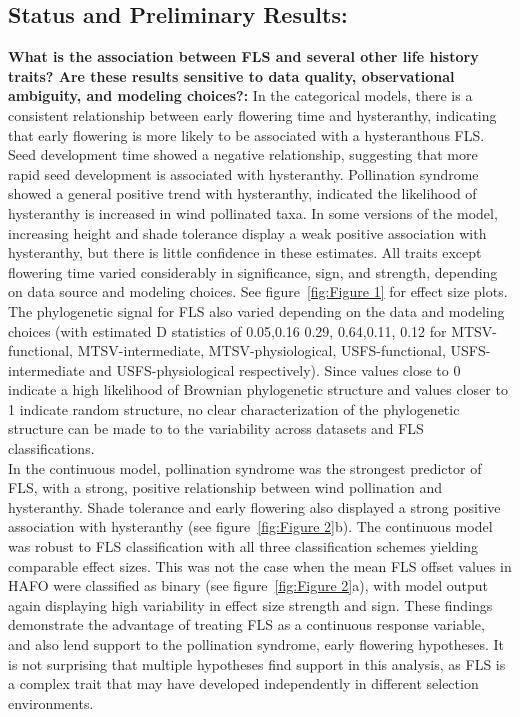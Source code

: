 \documentclass[12pt]{article}\usepackage[]{graphicx}\usepackage[]{color}
\begin{document}
\subsection*{Status and Preliminary Results:}
\indent\indent\textbf{What is the association between FLS and several other life history traits?  Are these results sensitive to data quality, observational ambiguity, and modeling choices?:} In the categorical models, there is a consistent relationship between early flowering time and hysteranthy, indicating that early flowering is more likely to be associated with a hysteranthous FLS. Seed development time showed a negative relationship, suggesting that more rapid seed development is associated with hysteranthy. Pollination syndrome showed a general positive trend with hysteranthy, indicated the likelihood of hysteranthy is increased in wind pollinated taxa. In some versions of the model, increasing height and shade tolerance display a weak positive association with hysteranthy, but there is little confidence in these estimates. All traits except flowering time varied considerably in significance, sign, and strength, depending on data source and modeling choices. See figure~\ref{fig:Figure 1} for effect size plots.\\
\indent The phylogenetic signal for FLS also varied depending on the data and modeling choices (with estimated D statistics of 0.05,0.16 0.29, 0.64,0.11, 0.12 for MTSV-functional, MTSV-intermediate, MTSV-physiological, USFS-functional, USFS-intermediate and USFS-physiological respectively). Since values close to 0 indicate a high likelihood of Brownian phylogenetic structure and values closer to 1 indicate random structure, no clear characterization of the phylogenetic structure can be made to to the variability across datasets and FLS classifications. \\
\indent In the continuous model, pollination syndrome was the strongest predictor of FLS, with a strong, positive relationship between wind pollination and hysteranthy. Shade tolerance and early flowering also displayed a strong positive association with hysteranthy (see figure~\ref{fig:Figure 2}b). The continuous model was robust to FLS classification with all three classification schemes yielding comparable effect sizes. This was not the case when the mean FLS offset values in HAFO were classified as binary (see figure~\ref{fig:Figure 2}a), with model output again displaying high variability in effect size strength and sign. These findings demonstrate the advantage of treating FLS as a continuous response variable, and also lend support to the pollination syndrome, early flowering hypotheses. It is not surprising that multiple hypotheses find support in this analysis, as FLS is a complex trait that may have developed independently in different selection environments.
\end{document}
